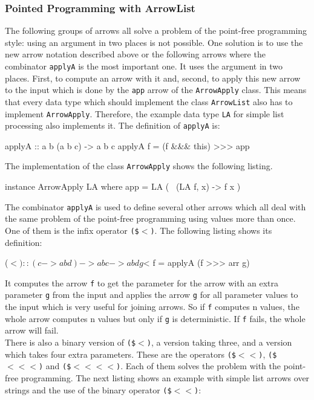 \documentclass[11pt,a4paper,headsepline, bibtotoc]{scrreprt}
\begin{document}
\subsubsection{Pointed Programming with ArrowList}
The following groups of arrows all solve a problem of the point-free programming style: using an argument in two places is not possible. One solution is to use the new arrow notation described above or the following arrows where the combinator \texttt{applyA} is the most important one. It uses the argument in two places. First, to compute an arrow with it and, second, to apply this new arrow to the input which is done by the \texttt{app} arrow of the \texttt{ArrowApply} class. This means that every data type which should implement the class \texttt{ArrowList} also has to implement \texttt{ArrowApply}. Therefore, the example data type \texttt{LA} for simple list processing also implements it. The definition of \texttt{applyA} is:
\begin{code}
applyA :: a b (a b c) -> a b c
applyA f = (f &&& this) >>> app
\end{code}
The implementation of the class \texttt{ArrowApply} shows the following listing. 
\begin{code}
instance ArrowApply LA where
    app = LA ( \ (LA f, x) -> f x )
\end{code}
The combinator \texttt{applyA} is used to define several other arrows which all deal with the same problem of the point-free programming using values more than once. One of them is the infix operator \texttt{(\$$<$)}. The following listing shows its definition:
\begin{code}
($<)    :: (c -> a b d) -> a b c -> a b d
g $< f    = applyA (f >>> arr g)
\end{code}
It computes the arrow \texttt{f} to get the parameter for the arrow with an extra parameter \texttt{g} from the input and applies the arrow \texttt{g} for all parameter values to the input which is very useful for joining arrows. So if \texttt{f} computes n values, the whole arrow computes n values but only if \texttt{g} is deterministic. If \texttt{f} fails, the whole arrow will fail.\\
There is also a binary version of \texttt{(\$$<$)}, a version taking three, and a version which takes four extra parameters. These are the operators \texttt{(\$$<<$)}, \texttt{(\$$<<<$)} and \texttt{(\$$<<<<$)}. Each of them solves the problem with the point-free programming. The next listing shows an example with simple list arrows over strings and the use of the binary operator \texttt{(\$$<<$)}: 
\end{document}
